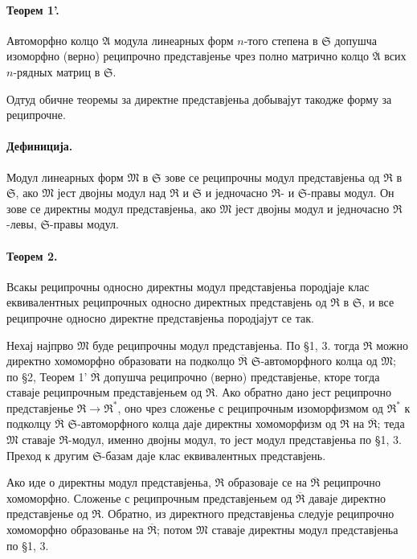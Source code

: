 ﻿\documentclass[11pt]{article}
\providecommand{\frM}{\mathfrak M}
\providecommand{\frR}{\mathfrak R}
\providecommand{\frS}{\mathfrak S}
\providecommand{\mA}{\mathfrak A}
\providecommand{\mbarA}{\overline{\mathfrak A}}
\begin{document}
\paragraph{Теорем 1'.}
Автоморфно колцо \(\mA\) модула линеарных форм \(n\)-того степена в \(\frS\) допушча изоморфно (верно) реципрочно представјенье чрез полно матрично колцо \(\mbarA\) всих \(n\)-рядных матриц в \(\frS\).

Одтуд обичне теоремы за директне представјеньа добывајут такодже форму за реципрочне.

\paragraph{Дефиниција.}
Модул линеарных форм \(\frM\) в \(\frS\) зове се реципрочны модул представјеньа од \(\frR\) в \(\frS\), ако \(\frM\) јест двојны модул над \(\frR\) и \(\frS\) и једночасно \(\frR\)- и \(\frS\)-правы модул. Он зове се директны модул представјеньа, ако \(\frM\) јест двојны модул и једночасно \(\frR\)-левы, \(\frS\)-правы модул.

\paragraph{Теорем 2.}
Всакы реципрочны односно директны модул представјеньа породјаје клас еквивалентных реципрочных односно директных представјень од \(\frR\) в \(\frS\), и все реципрочне односно директне представјеньа породјајут се так.

Нехај најпрво \(\frM\) буде реципрочны модул представјеньа. По §1, 3. тогда \(\frR\) можно директно хомоморфно образовати на подколцо \(\overline{\frR}\) \(\frS\)-автоморфного колца од \(\frM\); по §2, Теорем 1' \(\overline{\frR}\) допушча реципрочно (верно) представјенье, кторе тогда ставаје реципрочным представјеньем од \(\frR\). Ако обратно дано јест реципрочно представјенье \(\frR\to\frR^*\), оно чрез сложенье с реципрочным изоморфизмом од \(\frR^*\) к подколцу \(\overline{\frR}\) \(\frS\)-автоморфного колца даје директны хомоморфизм од \(\frR\) на \(\overline{\frR}\); теда \(\frM\) ставаје \(\frR\)-модул, именно двојны модул, то јест модул представјеньа по §1, 3. Преход к другим \(\frS\)-базам даје клас еквивалентных представјень.

Ако иде о директны модул представјеньа, \(\frR\) образоваје се на \(\overline{\frR}\) реципрочно хомоморфно. Сложенье с реципрочным представјеньем од \(\overline{\frR}\) даваје директно представјенье од \(\frR\). Обратно, из директного представјеньа следује реципрочно хомоморфно образованье на \(\overline{\frR}\); потом \(\frM\) ставаје директны модул представјеньа по §1, 3.
\end{document}
